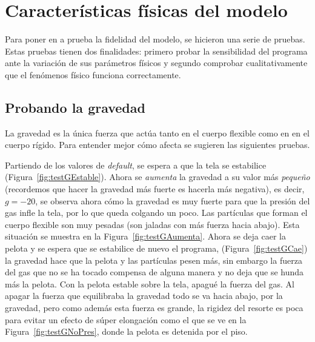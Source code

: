 \section{Características físicas del modelo}
Para poner en a prueba la fidelidad del modelo, se hicieron una serie de pruebas.
Estas pruebas tienen dos finalidades: primero probar la sensibilidad del programa ante la variación de sus parámetros físicos y segundo comprobar cualitativamente que el fenómenos físico funciona correctamente.

\subsection{Probando la gravedad}
La gravedad es la única fuerza que actúa tanto en el cuerpo flexible como en en el cuerpo rígido. Para entender mejor cómo afecta se sugieren las siguientes pruebas.

Partiendo de los valores de \emph{\textenglish{default}}, se espera a que la tela se estabilice (Figura~\ref{fig:testGEstable}).
Ahora se \emph{aumenta} la gravedad a su valor más \emph{pequeño} (recordemos que hacer la gravedad más fuerte es hacerla más negativa), es decir, $g=-20$, se observa ahora cómo la gravedad es muy fuerte para que la presión del gas infle la tela, por lo que queda colgando un poco.
Las partículas que forman el cuerpo flexible son muy pesadas (son jaladas con más fuerza hacia abajo).
Esta situación se muestra en la Figura~\ref{fig:testGAumenta}. 
Ahora se deja caer la pelota y se espera que se estabilice de nuevo el programa, (Figura~\ref{fig:testGCae}) la gravedad hace que la pelota y las partículas pesen más, sin embargo la fuerza del gas que no se ha tocado compensa de alguna manera y no deja que se hunda más la pelota.
Con la pelota estable sobre la tela, apagué la fuerza del gas.
Al apagar la fuerza que equilibraba la gravedad todo se va hacia abajo, por la gravedad, pero como además esta fuerza es grande, la rigidez del resorte es poca para evitar un efecto de súper elongación como el que se ve en la Figura~\ref{fig:testGNoPres}, donde la pelota es detenida por el piso.

